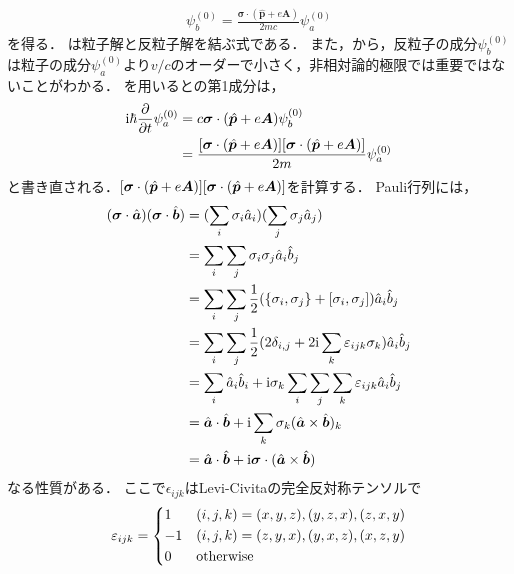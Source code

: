 \documentclass{report}
\begin{document}
  \begin{align}
    \psi_b^{(0)} = \frac{\bm{\sigma}\cdot(\hat{\bm{p}} + e\bm{A})}{2mc}\psi^{(0)}_a\label{particle-antiparticle}
  \end{align}
  を得る．
  は粒子解と反粒子解を結ぶ式である．
  また，から，反粒子の成分$\psi^{(0)}_b$は粒子の成分$\psi^{(0)}_a$より$v/c$のオーダーで小さく，非相対論的極限では重要ではないことがわかる．
  を用いるとの第1成分は，
  \begin{align}
    \i\hbar\pdv{t}\psi^{(0)}_a &= c\bm{\sigma} \cdot (\hat{\bm{p}} + e\bm{A})\psi_b^{(0)}\\
    &= \frac{\qty[\bm{\sigma}\cdot\qty(\hat{\bm{p}} + e\bm{A})]\qty[\bm{\sigma}\cdot\qty(\hat{\bm{p}} + e\bm{A})]}{2m}\psi^{(0)}_a
  \end{align}
  と書き直される．$\qty[\bm{\sigma}\cdot\qty(\hat{\bm{p}} + e\bm{A})]\qty[\bm{\sigma}\cdot\qty(\hat{\bm{p}} + e\bm{A})]$を計算する．
  Pauli行列には，
  \begin{align}
    (\bm{\sigma}\cdot\hat{\bm{a}})(\bm{\sigma}\cdot\hat{\bm{b}}) &= (\sum_{i} \sigma_i \hat{a}_i) (\sum_{j} \sigma_j \hat{a}_j)\\
    &= \sum_{i} \sum_{j} \sigma_{i} \sigma_{j} \hat{a}_i \hat{b}_j\\
    &= \sum_{i} \sum_{j} \frac{1}{2}(\qty{\sigma_i, \sigma_j} + [\sigma_i, \sigma_j]) \hat{a}_i \hat{b}_j\\
    &= \sum_{i} \sum_{j} \frac{1}{2}(2 \delta_{i,j} + 2\i \sum_{k} \epsilon_{ijk} \sigma_k) \hat{a}_i \hat{b}_j\\
    &= \sum_{i} \hat{a}_i \hat{b}_i + \i \sigma_k \sum_{i} \sum_{j} \sum_{k} \epsilon_{ijk} \hat{a}_i \hat{b}_j\\
    &= \hat{\bm{a}}\cdot\hat{\bm{b}} + \i \sum_{k} \sigma_k (\hat{\bm{a}} \times \hat{\bm{b}})_k\\
    &= \hat{\bm{a}}\cdot\hat{\bm{b}} + \i \bm{\sigma} \cdot (\hat{\bm{a}} \times \hat{\bm{b}}) \label{pauli-inner-product}
  \end{align}
  なる性質がある．
  ここで$\epsilon_{ijk}$はLevi-Civitaの完全反対称テンソルで
  \begin{align}
    \epsilon_{ijk} = 
    \begin{dcases}
      1 & (i, j, k) = (x, y, z), (y, z, x), (z, x, y) \\
      -1 & (i, j, k) = (z, y, x), (y, x, z), (x, z, y) \\
      0 & \text{otherwise}
    \end{dcases}
  \end{align}
\end{document}
